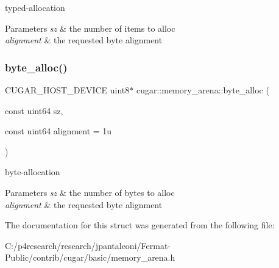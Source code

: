 typed-\/allocation


\begin{DoxyParams}{Parameters}
{\em sz} & the number of items to alloc \\
\hline
{\em alignment} & the requested byte alignment \\
\hline
\end{DoxyParams}
\mbox{\label{structcugar_1_1memory__arena_a8c3be4a3e7e2ccd71e044263fa3302d8}} 
\subsubsection{\texorpdfstring{byte\+\_\+alloc()}{byte\_alloc()}}
{\footnotesize\ttfamily C\+U\+G\+A\+R\+\_\+\+H\+O\+S\+T\+\_\+\+D\+E\+V\+I\+CE uint8$\ast$ cugar\+::memory\+\_\+arena\+::byte\+\_\+alloc (\begin{DoxyParamCaption}\item[{const uint64}]{sz,  }\item[{const uint64}]{alignment = {\ttfamily 1u} }\end{DoxyParamCaption})\hspace{0.3cm}{\ttfamily [inline]}}

byte-\/allocation


\begin{DoxyParams}{Parameters}
{\em sz} & the number of bytes to alloc \\
\hline
{\em alignment} & the requested byte alignment \\
\hline
\end{DoxyParams}


The documentation for this struct was generated from the following file\+:\begin{DoxyCompactItemize}
\item 
C\+:/p4research/research/jpantaleoni/\+Fermat-\/\+Public/contrib/cugar/basic/memory\+\_\+arena.\+h\end{DoxyCompactItemize}

